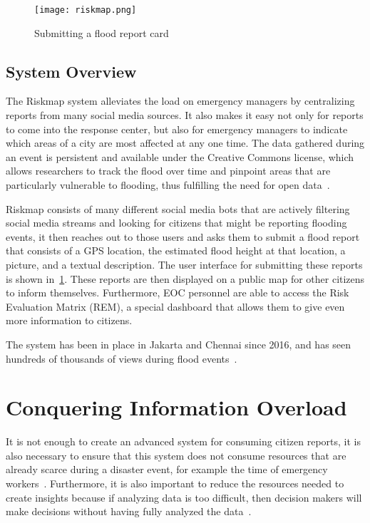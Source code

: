   
  \begin{figure} \texttt{[image: riskmap.png]}
  \caption{Submitting a flood report card}\label{fig:cards} \end{figure}
  \subsection{System Overview} The Riskmap system alleviates the load on
  emergency managers by centralizing reports from many social media
  sources. It also makes it easy not only for reports to come into the
  response center, but also for emergency managers to indicate which areas
  of a city are most affected at any one time. The data gathered during an
  event is persistent and available under the Creative Commons license,
  which allows researchers to track the flood over time and pinpoint areas
  that are particularly vulnerable to flooding, thus fulfilling the need
  for open data~\cite{PhilippinesPDCCollaborate,
  antaranews.comBNPBPetaBencanaId}.
  
  Riskmap consists of many different social media bots that are actively
  filtering social media streams and looking for citizens that might be
  reporting flooding events, it then reaches out to those users and asks
  them to submit a flood report that consists of a GPS location, the
  estimated flood height at that location, a picture, and a textual
  description. The user interface for submitting these reports is shown
  in~\ref{fig:cards}. These reports are then displayed on a public map for other
  citizens to inform themselves. Furthermore, EOC personnel are able to
  access the Risk Evaluation Matrix (REM), a special dashboard that allows
  them to give even more information to citizens.
  
  The system has been in place in Jakarta and Chennai since 2016, and has
  seen hundreds of thousands of views during flood
  events~\cite{noveckOpinionElectionsWon2018, oct31ChennaiGetsRain}.

\section{Conquering Information Overload} It is not enough to create an advanced
  system for consuming citizen reports, it is also necessary to ensure that this
  system does not consume resources that are already scarce during a disaster
  event, for example the time of emergency
  workers~\cite{aminDataNaturalDisasters2008}. Furthermore, it is also important
  to reduce the
  resources needed to create insights because if analyzing data is too 
  difficult, then decision makers will make decisions without having fully
  analyzed the data~\cite{quarantelliUrbanVulnerabilityDisasters2003}.
  
